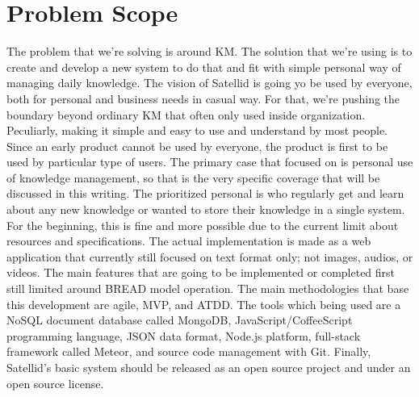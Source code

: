 \section{Problem Scope}
\label{sec:problem-scope}

The problem that we're solving is around \ac{KM}.
The solution that we're using is to create and develop a new system to do that and fit with simple personal way of managing daily knowledge.
The vision of Satellid is going yo be used by everyone, both for personal and business needs in casual way.
For that, we're pushing the boundary beyond ordinary \ac{KM} that often only used inside organization.
Peculiarly, making it simple and easy to use and understand by most people.
Since an early product cannot be used by everyone, the product is first to be used by particular type of users.
The primary case that focused on is personal use of knowledge management, so that is the very specific coverage that will be discussed in this writing.
The prioritized personal is who regularly get and learn about any new knowledge or wanted to store their knowledge in a single system.
For the beginning, this is fine and more possible due to the current limit about resources and specifications.
The actual implementation is made as a web application that currently still focused on text format only; not images, audios, or videos.
The main features that are going to be implemented or completed first still limited around \ac{BREAD} model operation.
The main methodologies that base this development are agile, \ac{MVP}, and \ac{ATDD}.
The tools which being used are a NoSQL document database called MongoDB, JavaScript/CoffeeScript programming language, JSON data format, Node.js platform, full-stack framework called Meteor, and source code management with Git.
Finally, Satellid's basic system should be released as an open source project and under an open source license.
